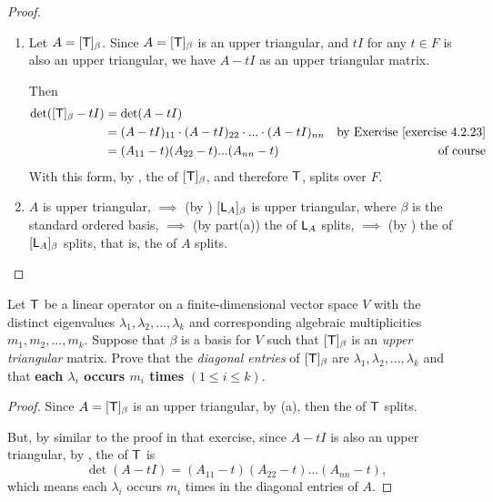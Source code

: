 \begin{proof} \ 

\begin{enumerate}
\item Let \(A = [\textsf{T}]_{\beta}\).
Since \(A = [\textsf{T}]_{\beta}\) is an upper triangular, and \(tI\) for any \(t \in F\) is also an upper triangular, we have \(A - tI\) as an upper triangular matrix.

Then
\begin{align*}
    \det([\T]_{\beta} - tI)
        & = \det(A - tI) \\
        & = (A - tI)_{11} \cdot (A - tI)_{22} \cdot ... \cdot (A - tI)_{nn} & \text{by \EXEC{4.2.23}} \\
        & = (A_{11} - t)(A_{22} - t) ... (A_{nn} - t) & \text{of course}
\end{align*}
With this form, by , the \CPOLY{} of \([\textsf{T}]_{\beta}\), and therefore \(\textsf{T}\), splits over \(F\).

\item \(A\) is upper triangular, \(\implies\) (by ) \([\textsf{L}_A]_{\beta}\) is upper triangular, where \(\beta\) is the standard ordered basis, \(\implies\) (by part(a)) the \CPOLY{} of \(\textsf{L}_A\) splits, \(\implies\) (by ) the \CPOLY{} of \([\textsf{L}_A]_{\beta}\) splits, that is, the \CPOLY{} of \(A\) splits.
\end{enumerate}
\end{proof}

\begin{exercise} \label{exercise 5.2.10}
Let \(\textsf{T}\) be a linear operator on a finite-dimensional vector space \(V\) with the distinct eigenvalues \(\lambda_1, \lambda_2, ..., \lambda_k\) and corresponding algebraic multiplicities \(m_1, m_2, ..., m_k\).
Suppose that \(\beta\) is a basis for \(V\) such that \([\textsf{T}]_{\beta}\) is an \emph{upper triangular} matrix.
Prove that the \emph{diagonal entries} of \([\textsf{T}]_{\beta}\) are \(\lambda_1, \lambda_2, ..., \lambda_k\) and that \textbf{each \(\lambda_i\) occurs \(m_i\) times} \((1 \le i \le k)\).
\end{exercise}

\begin{proof}
Since \(A = [\textsf{T}]_{\beta}\) is an upper triangular, by (a), then the \CPOLY{} of \(\textsf{T}\) splits.

But, by similar to the proof in that exercise, since \(A - tI\) is also an upper triangular, by , the \CPOLY{} of \(\textsf{T}\) is
\[
    \det(A - tI) = (A_{11} - t)(A_{22} - t) ... (A_{nn} - t),
\]
which means each \(\lambda_i\) occurs \(m_i\) times in the diagonal entries of \(A\).
\end{proof}

